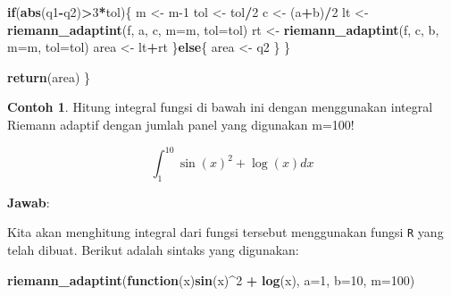 \documentclass[
]{book}
\newenvironment{Shaded}{\begin{snugshade}}{\end{snugshade}}
\newcommand{\AttributeTok}[1]{\textcolor[rgb]{0.13,0.29,0.53}{#1}}
\newcommand{\ControlFlowTok}[1]{\textcolor[rgb]{0.13,0.29,0.53}{\textbf{#1}}}
\newcommand{\DecValTok}[1]{\textcolor[rgb]{0.00,0.00,0.81}{#1}}
\newcommand{\FunctionTok}[1]{\textcolor[rgb]{0.13,0.29,0.53}{\textbf{#1}}}
\newcommand{\NormalTok}[1]{#1}
\newcommand{\OtherTok}[1]{\textcolor[rgb]{0.56,0.35,0.01}{#1}}
\newcommand{\SpecialCharTok}[1]{\textcolor[rgb]{0.81,0.36,0.00}{\textbf{#1}}}
\theoremstyle{definition}
\theoremstyle{definition}
\newtheorem{example}{Contoh}[chapter]
\theoremstyle{definition}
\theoremstyle{definition}
\theoremstyle{remark}
\begin{document}
\begin{Shaded}
\begin{Highlighting}[]
    \ControlFlowTok{if}\NormalTok{(}\FunctionTok{abs}\NormalTok{(q1}\SpecialCharTok{{-}}\NormalTok{q2)}\SpecialCharTok{\textgreater{}}\DecValTok{3}\SpecialCharTok{*}\NormalTok{tol)\{}
\NormalTok{      m }\OtherTok{\textless{}{-}}\NormalTok{ m}\DecValTok{{-}1}
\NormalTok{      tol }\OtherTok{\textless{}{-}}\NormalTok{ tol}\SpecialCharTok{/}\DecValTok{2}
\NormalTok{      c }\OtherTok{\textless{}{-}}\NormalTok{ (a}\SpecialCharTok{+}\NormalTok{b)}\SpecialCharTok{/}\DecValTok{2}
\NormalTok{      lt }\OtherTok{\textless{}{-}} \FunctionTok{riemann\_adaptint}\NormalTok{(f, a, c, }\AttributeTok{m=}\NormalTok{m, }\AttributeTok{tol=}\NormalTok{tol)}
\NormalTok{      rt }\OtherTok{\textless{}{-}} \FunctionTok{riemann\_adaptint}\NormalTok{(f, c, b, }\AttributeTok{m=}\NormalTok{m, }\AttributeTok{tol=}\NormalTok{tol) }
\NormalTok{      area }\OtherTok{\textless{}{-}}\NormalTok{ lt}\SpecialCharTok{+}\NormalTok{rt}
\NormalTok{    \}}\ControlFlowTok{else}\NormalTok{\{}
\NormalTok{      area }\OtherTok{\textless{}{-}}\NormalTok{ q2}
\NormalTok{    \}}
\NormalTok{  \}}
  
  \FunctionTok{return}\NormalTok{(area)}
\NormalTok{\}}
\end{Highlighting}
\end{Shaded}

\begin{example}
\protect\hypertarget{exm:adaptexm}{}\label{exm:adaptexm}Hitung integral fungsi di bawah ini dengan menggunakan integral Riemann adaptif dengan jumlah panel yang digunakan m=100!
\end{example}

\[
\int_{1}^{10} \sin\left(x\right)^2+\log\left(x\right)dx
\]

\textbf{Jawab}:

Kita akan menghitung integral dari fungsi tersebut menggunakan fungsi \texttt{R} yang telah dibuat. Berikut adalah sintaks yang digunakan:

\begin{Shaded}
\begin{Highlighting}[]
\FunctionTok{riemann\_adaptint}\NormalTok{(}\ControlFlowTok{function}\NormalTok{(x)}\FunctionTok{sin}\NormalTok{(x)}\SpecialCharTok{\^{}}\DecValTok{2} \SpecialCharTok{+} \FunctionTok{log}\NormalTok{(x),}
                 \AttributeTok{a=}\DecValTok{1}\NormalTok{, }\AttributeTok{b=}\DecValTok{10}\NormalTok{, }\AttributeTok{m=}\DecValTok{100}\NormalTok{)}
\end{Highlighting}
\end{Shaded}
\end{document}
